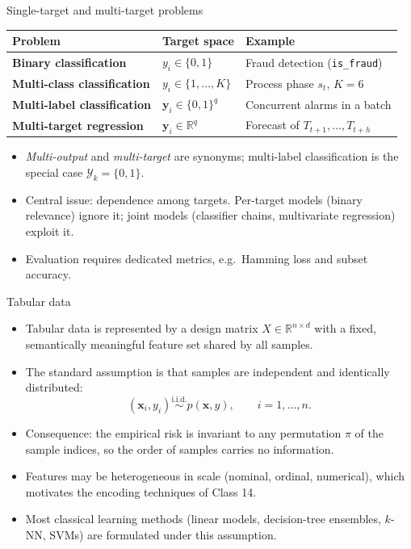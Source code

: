 \begin{frame}{Single-target and multi-target problems}
\vspace{0.4em}

{\footnotesize
\begin{tabularx}{\textwidth}{>{\bfseries}l >{\raggedright\arraybackslash}p{4.4cm} >{\raggedright\arraybackslash}X}
Problem & Target space & Example \\
\toprule
Binary classification & $y_i \in \{0, 1\}$ & Fraud detection (\texttt{is\_fraud}) \\
Multi-class classification & $y_i \in \{1, \dots, K\}$ & Process phase $s_t$, $K = 6$ \\
Multi-label classification & $\mathbf{y}_i \in \{0, 1\}^{q}$ & Concurrent alarms in a batch \\
Multi-target regression & $\mathbf{y}_i \in \mathbb{R}^{q}$ & Forecast of $T_{t+1}, \dots, T_{t+h}$ \\
\bottomrule
\end{tabularx}
}
\vspace{0.4em}
\begin{itemize}\footnotesize
\item \emph{Multi-output} and \emph{multi-target} are synonyms; multi-label classification is the special case $\mathcal{Y}_k = \{0, 1\}$.
\item Central issue: dependence among targets. Per-target models (binary relevance) ignore it; joint models (classifier chains, multivariate regression) exploit it.
\item Evaluation requires dedicated metrics, e.g.\ Hamming loss and subset accuracy.
\end{itemize}
\coursefooter
\end{frame}

\begin{frame}{Tabular data}
\begin{itemize}
\item Tabular data is represented by a design matrix $X \in \mathbb{R}^{n \times d}$ with a fixed, semantically meaningful feature set shared by all samples.
\item The standard assumption is that samples are independent and identically distributed:
\[
(\mathbf{x}_i, y_i) \overset{\text{i.i.d.}}{\sim} p(\mathbf{x}, y), \qquad i = 1,\dots,n.
\]
\item Consequence: the empirical risk is invariant to any permutation $\pi$ of the sample indices, so the order of samples carries no information.
\item Features may be heterogeneous in scale (nominal, ordinal, numerical), which motivates the encoding techniques of Class 14.
\item Most classical learning methods (linear models, decision-tree ensembles, $k$-NN, SVMs) are formulated under this assumption.
\end{itemize}
\coursefooter
\end{frame}

